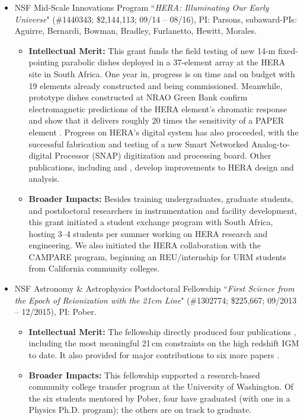 \documentclass[preprint,11pt]{aastex}
\newcommand{\Mycitep}[1]{\citep{#1}}
\begin{document}
\begin{itemize}[noitemsep,nolistsep,leftmargin=11pt]
\item NSF Mid-Scale Innovations Program ``{\it HERA: Illuminating Our Early Universe}" 
(\#1440343; \$2,144,113; 09/14 -- 08/16), PI: Parsons, subaward-PIs: Aguirre, Bernardi,
Bowman, Bradley, Furlanetto, Hewitt, Morales. 
\begin{itemize}[noitemsep,nolistsep,leftmargin=11pt]
\item{\bf Intellectual Merit:}
This grant funds the field testing of new 14-m fixed-pointing parabolic dishes deployed in a 37-element array at the HERA site in South Africa. One year in,
progress is on time and on budget with 19 elements already constructed and being commissioned. 
Meanwhile, prototype dishes constructed at NRAO Green Bank confirm electromagnetic predictions of the HERA element's chromatic response and show that it delivers roughly 20 times the sensitivity of a PAPER element \Mycitep{neben_et_al2016,thyagarajan_et_al2016,ewallwice_et_al2016,patra_et_al2016}.
Progress on HERA's digital system has also proceeded, with the successful fabrication and testing of a
new Smart Networked Analog-to-digital Processor (SNAP) digitization and processing board.  
Other publications, including \citet{zheng_et_al2014,dillon_et_al2015,dillon_parsons2016} and \citet{kohn_et_al2016}, develop improvements to HERA design and analysis.

\item{\bf Broader Impacts:}
Besides training undergraduates, graduate students, and postdoctoral researchers in instrumentation 
and facility development, this grant initiated a student exchange 
program with South Africa, hosting 3--4 students per summer working on HERA research and engineering.
We also initiated the HERA collaboration with the CAMPARE program, beginning an REU/internship
for URM students from California community colleges.
\end{itemize}

\item NSF Astronomy \& Astrophysics Postdoctoral Fellowship  ``{\it First Science from the Epoch of Reionization with the 21cm Line}" 
(\#1302774; \$225,667; 09/2013 -- 12/2015), PI: Pober.
\begin{itemize}[noitemsep,nolistsep,leftmargin=11pt]
\item{\bf Intellectual Merit:} 
The fellowship directly produced four publications \citep{pober_et_al2014,pober2015,pober_et_al2015,pober_et_al2016}, including the most meaningful 21\,cm constraints on the high redshift IGM to date. It also provided for major contributions to six more papers
\citep{jacobs_et_al2013,parsons_et_al2014,jacobs_et_al2015,thyagarajan_et_al2015a,thyagarajan_et_al2015b,ali_et_al2015}.  
\item{\bf Broader Impacts:}
This fellowship supported a research-based community college transfer program at the University of Washington. Of the six students mentored by Pober, four have graduated (with one in a Physics 
Ph.D. program); the others are on track to graduate.
\end{itemize}


\end{itemize}
\end{document}
